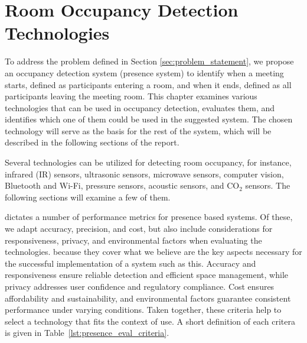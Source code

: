 \chapter{Room Occupancy Detection Technologies}\label{chap:presence_intro}
To address the problem defined in Section \ref{sec:problem_statement}, we propose an occupancy detection system (presence system) to identify when a meeting starts, defined as participants entering a room, and when it ends, defined as all participants leaving the meeting room.
This chapter examines various technologies that can be used in occupancy detection, evaluates them, and identifies which one of them could be used in the suggested system.
The chosen technology will serve as the basis for the rest of the system, which will be described in the following sections of the report.

Several technologies can be utilized for detecting room occupancy, for instance, infrared (IR) sensors\cite{woodward-2021, dodierBuildingOccupancyDetection2006, OccupancySensorMotion}, ultrasonic sensors\cite{woodward-2021, dodierBuildingOccupancyDetection2006, OccupancySensorMotion}, microwave sensors\cite{woodward-2021}, computer vision\cite{co2sensor, longoAccurateOccupancyEstimation2019, OccupancySensorMotion}, Bluetooth and Wi-Fi\cite{longoAccurateOccupancyEstimation2019}, pressure sensors\cite{OccupancySensorMotion}, acoustic sensors\cite{OccupancySensorMotion}, and $\text{CO}_{2}$ sensors\cite{co2sensor, longoAccurateOccupancyEstimation2019, jinSensingProxyOccupancy2015}.\cite{faragherLocationFingerprintingBluetooth2015}
The following sections will examine a few of them.

\citeauthor{presence_ble_review} \cite{presence_ble_review} dictates a number of performance metrics for presence based systems. Of these, we adapt accuracy, precision, and cost, but also include considerations for responsiveness, privacy, and environmental factors when evaluating the technologies.
because they cover what we believe are the key aspects necessary for the successful implementation of a system such as this.
Accuracy and responsiveness ensure reliable detection and efficient space management, while privacy addresses user confidence and regulatory compliance.
Cost ensures affordability and sustainability, and environmental factors guarantee consistent performance under varying conditions.
Taken together, these criteria help to select a technology that fits the context of use.
A short definition of each critera is given in Table~\ref{lst:presence_eval_criteria}.



